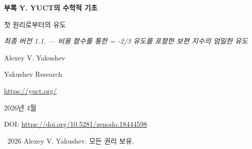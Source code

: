 \documentclass[11pt,a4paper]{article}
\begin{document}
	
	\begin{titlepage}
		\centering
		\vspace*{0cm}
		
		{\Huge\bfseries 부록 Y. YUCT의 수학적 기초\par}
		\vspace{0.3cm}
		{\Large 첫 원리로부터의 유도\par}
		\vspace{0.3cm}
		{\large \textit{최종 버전 1.1. — 비용 함수를 통한 \mu = -2/3 유도를 포함한 보편 지수의 엄밀한 유도}\par}
		\vspace{1.5cm}
		
		{\large Alexey V. Yakushev\par}
		\vspace{0.3cm}
		{\normalsize Yakushev Research\par}
		{\normalsize \url{https://yuct.org/}\par}
		
		\vspace{0.5cm}
		{\normalsize 2026년 4월\par}
		\vspace{0.3cm}
		{\normalsize DOI: \url{https://doi.org/10.5281/zenodo.18444598}\par}
		
		\vfill
		
		\begin{abstract}
			\noindent
			본 문서는 Yakushev 통합 조정 이론 (YUCT)의 수학적 기초를 엄밀하고 자기-일관된 형태로 제시한다. 조정 클러스터와 효율 매개변수 \(K_{\mathrm{eff}}\)의 정의로부터 출발하여 조정 네트워크의 미시적 모델을 구축한다. 세 가지 기본 공리 — 계층적 척도 불변성, 사전의 이진 완전성, 3차원 내장 — 으로부터 수준 간 엔트로피 분포를 결정한다. 네 번째 거시적 척도 불변성 공리와 인덱스 전달에 대한 명시적 비용 함수를 추가함으로써, 보편 오차 법칙 \(\varepsilon \propto K_{\mathrm{eff}}^{-\beta}\) (\(\beta = 2/3\))을 정리로서 유도한다. 조정 장에 대한 유효 스칼라-텐서 작용, 수정된 아인슈타인 방정식, 우주 상수의 위상학적 기원, 그리고 페르미온 질량 계층은 핵심 정리에 기반한 귀결 또는 추측으로 도입된다. 모든 주장은 공리, 정리, 추측, 가정 또는 현상학적 법칙으로 명시적으로 표시된다. 이 이론은 온도 의존 중력 상수를 포함한 구체적이고 반증 가능한 예측을 제공한다. 새로운 절은 보편 오차 법칙을 소수의 점근적 분포 (본문의 정리~4)와 연결하며, 동일한 지수 \(\beta = 2/3\)가 소수 변동을 지배함을 보여준다.
		\end{abstract}
		
		\vspace{0.5cm}
		\textcopyright\ 2026 Alexey V. Yakushev. 모든 권리 보유.
	\end{titlepage}
	
\end{document}
